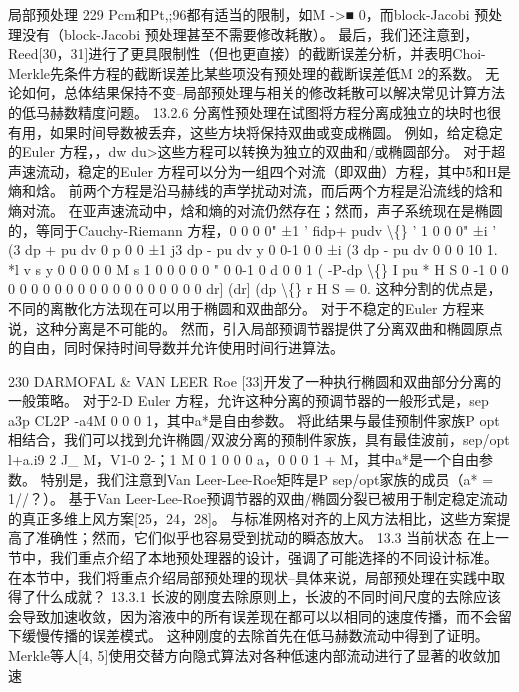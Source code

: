 \documentclass[UTF8,11pt,a4paper,openany,fontset=fandol]{ctexbook}
\begin{document}
局部预处理 229 Pcm和Pt,;96都有适当的限制，如M ->■ 0，而block-Jacobi 预处理没有（block-Jacobi 预处理甚至不需要修改耗散）。 最后，我们还注意到，Reed[30，31]进行了更具限制性（但也更直接）的截断误差分析，并表明Choi-Merkle先条件方程的截断误差比某些项没有预处理的截断误差低M 2的系数。 无论如何，总体结果保持不变--局部预处理与相关的修改耗散可以解决常见计算方法的低马赫数精度问题。 13.2.6 分离性预处理在试图将方程分离成独立的块时也很有用，如果时间导数被丢弃，这些方块将保持双曲或变成椭圆。 例如，给定稳定的Euler 方程，，dw du>这些方程可以转换为独立的双曲和/或椭圆部分。 对于超声速流动，稳定的Euler 方程可以分为一组四个对流（即双曲）方程，其中5和H是熵和焓。 前两个方程是沿马赫线的声学扰动对流，而后两个方程是沿流线的焓和熵对流。 在亚声速流动中，焓和熵的对流仍然存在；然而，声子系统现在是椭圆的，等同于Cauchy-Riemann 方程，0 0 0 0" ±1 ' fidp+ pudv \textbackslash\{\} ' 1 0 0 0" ±i ' (3 dp + pu dv 0 p 0 0 ±1 j3 dp - pu dv y 0 0-1 0 0 ±i (3 dp - pu dv 0 0 0 10 1. *l v s y 0 0 0 0 0 M s 1 0 0 0 0 0 " 0 0-1 0 d 0 0 1 ( -P-dp \textbackslash\{\} I pu * H S 0 -1 0 0 0 0 0 0 0 0 0 0 0 0 0 0 0 0 0 0 0 dr] (dr] (dp \textbackslash\{\} r H S = 0. 这种分割的优点是，不同的离散化方法现在可以用于椭圆和双曲部分。 对于不稳定的Euler 方程来说，这种分离是不可能的。 然而，引入局部预调节器提供了分离双曲和椭圆原点的自由，同时保持时间导数并允许使用时间行进算法。

230 DARMOFAL \& VAN LEER Roe [33]开发了一种执行椭圆和双曲部分分离的一般策略。 对于2-D Euler 方程，允许这种分离的预调节器的一般形式是，sep a3p CL2P -a4M 0 0 0 1，其中a*是自由参数。 将此结果与最佳预制件家族P opt相结合，我们可以找到允许椭圆/双波分离的预制件家族，具有最佳波前，sep/opt l+a.i9 2 J\_ M，V1-0 2-；1 M 0 1 0 0 0 a，0 0 0 1 + M，其中a*是一个自由参数。 特别是，我们注意到Van Leer-Lee-Roe矩阵是P sep/opt家族的成员（a* = 1//？）。 基于Van Leer-Lee-Roe预调节器的双曲/椭圆分裂已被用于制定稳定流动的真正多维上风方案[25，24，28]。 与标准网格对齐的上风方法相比，这些方案提高了准确性；然而，它们似乎也容易受到扰动的瞬态放大。 13.3 当前状态 在上一节中，我们重点介绍了本地预处理器的设计，强调了可能选择的不同设计标准。 在本节中，我们将重点介绍局部预处理的现状--具体来说，局部预处理在实践中取得了什么成就？ 13.3.1 长波的刚度去除原则上，长波的不同时间尺度的去除应该会导致加速收敛，因为溶液中的所有误差现在都可以以相同的速度传播，而不会留下缓慢传播的误差模式。 这种刚度的去除首先在低马赫数流动中得到了证明。 Merkle等人[4, 5]使用交替方向隐式算法对各种低速内部流动进行了显著的收敛加速
\end{document}
